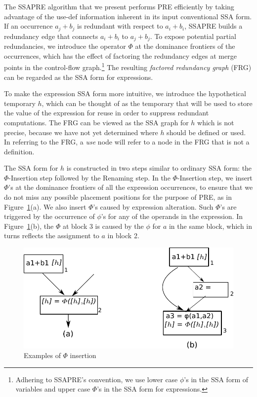The SSAPRE algorithm that we present performs PRE efficiently by taking 
advantage of the use-def information inherent in its input conventional SSA 
form.  If an occurrence $a_j+b_j$ is redundant with respect to $a_i+b_i$, SSAPRE
builds a redundancy edge that connects $a_i+b_i$ to
$a_j+b_j$.  To expose potential partial redundancies, we introduce the 
operator $\Phi$ at the dominance frontiers of the occurrences, which has the 
effect of factoring the redundancy edges at merge points in the control-flow graph.\footnote{Adhering to SSAPRE's convention, we use lower case 
$\phi$'s in the SSA form of variables and upper case $\Phi$'s
in the SSA form for expressions.} The resulting \emph{factored redundancy 
graph} (FRG) can be regarded as the SSA form for expressions.

To make the expression SSA form more intuitive, we introduce the 
hypothetical temporary $h$,
which can be thought of as the temporary that will be used to store the value
of the expression for reuse in order to suppress redundant computations.
The FRG can be viewed as the SSA graph for $h$ which is not precise,
because we have not yet determined where $h$ should be defined or used.
In referring to the FRG, a \emph{use} node will refer to a node in the FRG
that is not a definition.

The SSA form for $h$ is constructed in two steps similar to ordinary SSA
form: the $\Phi$-Insertion step followed by the Renaming step.  
In the $\Phi$-Insertion 
step, we insert $\Phi$'s at the dominance frontiers of all the expression 
occurrences, to ensure that we do not miss any possible placement positions
for the purpose of PRE, as in Figure~\ref{fig: phi-insertion}(a).
We also insert $\Phi$'s caused by expression alteration.
Such $\Phi$'s are triggered by the occurrence of $\phi$'s
for any of the operands in the expression.
In Figure~\ref{fig: phi-insertion}(b), the $\Phi$ at block 3 is caused by
the $\phi$ for $a$ in the same block, which in turns reflects the
assignment to $a$ in block 2.

\begin{figure}
\centering
\includegraphics[scale=0.45]{fig-phi-insertion.pdf}
\caption{Examples of $\Phi$ insertion}
\label{fig: phi-insertion}
\end{figure}

